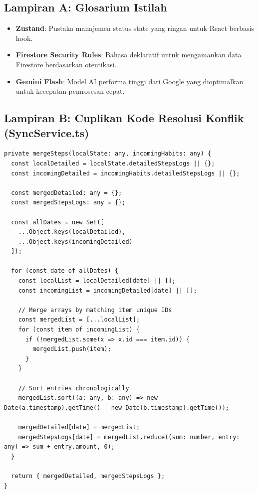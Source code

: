 \documentclass[12pt,a4paper]{article}
\begin{document}
\subsection{Lampiran A: Glosarium Istilah}
\begin{itemize}
    \item \textbf{Zustand}: Pustaka manajemen status state yang ringan untuk React berbasis hook.
    \item \textbf{Firestore Security Rules}: Bahasa deklaratif untuk mengamankan data Firestore berdasarkan otentikasi.
    \item \textbf{Gemini Flash}: Model AI performa tinggi dari Google yang dioptimalkan untuk kecepatan pemrosesan cepat.
\end{itemize}

\subsection{Lampiran B: Cuplikan Kode Resolusi Konflik (SyncService.ts)}
\begin{lstlisting}[caption=Logika Penggabungan Langkah Kaki Unik]
private mergeSteps(localState: any, incomingHabits: any) {
  const localDetailed = localState.detailedStepsLogs || {};
  const incomingDetailed = incomingHabits.detailedStepsLogs || {};
  
  const mergedDetailed: any = {};
  const mergedStepsLogs: any = {};

  const allDates = new Set([
    ...Object.keys(localDetailed),
    ...Object.keys(incomingDetailed)
  ]);

  for (const date of allDates) {
    const localList = localDetailed[date] || [];
    const incomingList = incomingDetailed[date] || [];

    // Merge arrays by matching item unique IDs
    const mergedList = [...localList];
    for (const item of incomingList) {
      if (!mergedList.some(x => x.id === item.id)) {
        mergedList.push(item);
      }
    }

    // Sort entries chronologically
    mergedList.sort((a: any, b: any) => new Date(a.timestamp).getTime() - new Date(b.timestamp).getTime());
    
    mergedDetailed[date] = mergedList;
    mergedStepsLogs[date] = mergedList.reduce((sum: number, entry: any) => sum + entry.amount, 0);
  }

  return { mergedDetailed, mergedStepsLogs };
}
\end{lstlisting}
\end{document}
